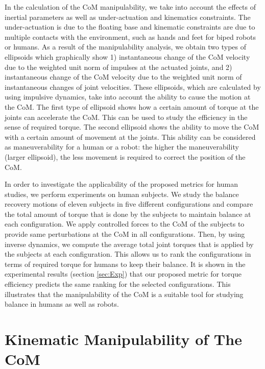 In the calculation of the CoM manipulability, we take into account the effects
of inertial parameters as well as under-actuation and kinematics constraints.
The under-actuation is due to the floating base and kinematic constraints are
due to multiple contacts with the environment, such as hands and feet for
biped robots or humans.  As a result of the manipulability analysis, we obtain
two types of ellipsoids which graphically show 1) instantaneous change of the
CoM velocity due to the weighted unit norm of impulses at the actuated joints,
and 2) instantaneous change of the CoM velocity due to the weighted unit norm
of instantaneous changes of joint velocities.  These ellipsoids, which are
calculated by using impulsive dynamics, take into account the ability to cause
the motion at the CoM.  The first type of ellipsoid shows how a certain amount
of torque at the joints can accelerate the CoM.  This can be used to study the
efficiency in the sense of required torque.  The second ellipsoid shows the
ability to move the CoM with a certain amount of movement at the joints.  This
ability can be considered as maneuverability for a human or a robot: the
higher the maneuverability (larger ellipsoid), the less movement is required
to correct the position of the CoM.

In order to investigate the applicability of the proposed metrics for human
studies, we perform experiments on human subjects.  We study the balance
recovery motions of eleven subjects in five different configurations and
compare the total amount of torque that is done by the subjects to maintain
balance at each configuration.  We apply controlled forces to the CoM of the
subjects to provide same perturbations at the CoM in all configurations.
Then, by using inverse dynamics, we compute the average total joint torques
that is applied by the subjects at each configuration.  This allows us to rank
the configurations in terms of required torque for humans to keep their
balance.  It is shown in the experimental results (section \ref{sec:Exp}) that
our proposed metric for torque efficiency predicts the same ranking for the
selected configurations.  This illustrates that the manipulability of the CoM
is a suitable tool for studying balance in humans as well as robots.


\section{Kinematic Manipulability of The CoM}
\label{sec:KinManip}

